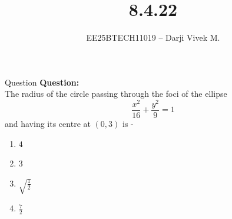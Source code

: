 \documentclass{beamer}
\title{8.4.22}
\author{EE25BTECH11019 -- Darji Vivek M.}
\date{}
\begin{document}
\begin{frame}
\begin{titlepage}

\end{titlepage}
\end{frame}
\begin{frame}{Question}
\textbf{Question:}\\[2pt]
The radius of the circle passing through the foci of the ellipse
\[
\frac{x^2}{16}+\frac{y^2}{9}=1
\]
and having its centre at $(0,3)$ is -\\[6pt]
\begin{enumerate}
    \item $4$
    \item $3$
    \item $\sqrt{\frac{1}{2}}$
    \item $\frac{7}{2}$
\end{enumerate}
\end{frame}
\end{document}
